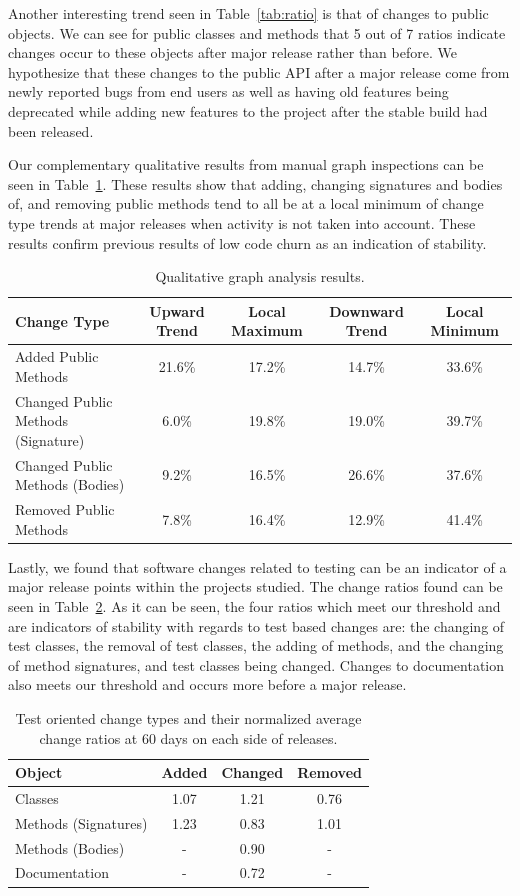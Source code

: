 \documentclass{sig-alternate}
\begin{document}
Another interesting trend seen in Table~\ref{tab:ratio} is that of changes to public objects. We can see for public classes and methods that
5 out of 7 ratios indicate changes occur to these objects after major release rather than before. We hypothesize that these changes to the public API
after a major release come from newly reported bugs from end users as well as having old features being deprecated while adding new features to the project
after the stable build had been released.

Our complementary qualitative results from manual graph inspections can be seen in Table~\ref{tab:qual}. These results show that adding, changing signatures
and bodies of, and removing public methods tend to all be at a local minimum of change type trends at major releases when activity is not taken into
account. These results confirm previous results of low code churn as an indication of stability.

\begin{table}[tb!]
\centering
\caption{Qualitative graph analysis results. \label{tab:qual}}
\begin{tabular}{| l | c | c | c | c |}
\hline
Change Type & Upward Trend & Local Maximum & Downward Trend & Local Minimum\\
\hline
Added Public Methods & 21.6\% & 17.2\% & 14.7\% & 33.6\% \\
Changed Public Methods (Signature) & 6.0\% & 19.8\% & 19.0\% & 39.7\% \\
Changed Public Methods (Bodies) & 9.2\% & 16.5\% & 26.6\% & 37.6\% \\
Removed Public Methods & 7.8\% & 16.4\% & 12.9\% & 41.4\% \\
\hline
\end{tabular}
\end{table}

Lastly, we found that software changes related to testing can be an indicator of a major release points within the projects studied. The change
ratios found can be seen in Table~\ref{tab:test}. As it can be seen, the four ratios which meet our threshold and are indicators of stability with regards to test based
changes are: the changing of test classes, the removal of test classes, the adding of methods, and the changing of method signatures, and test classes being changed.
Changes to documentation also meets our threshold and occurs more before a major release.

\begin{table}[h]
\centering
\caption{Test oriented change types and their normalized average change ratios at 60 days on each side of releases. \label{tab:test}}
\begin{tabular}{| l | c | c | c |}
\hline
Object & Added & Changed & Removed\\
\hline
Classes & 1.07 & 1.21 & 0.76 \\
Methods (Signatures) & 1.23 & 0.83 & 1.01 \\
Methods (Bodies) & - & 0.90 & - \\
Documentation & - & 0.72 & - \\
\hline
\end{tabular}
\end{table}
\end{document}
